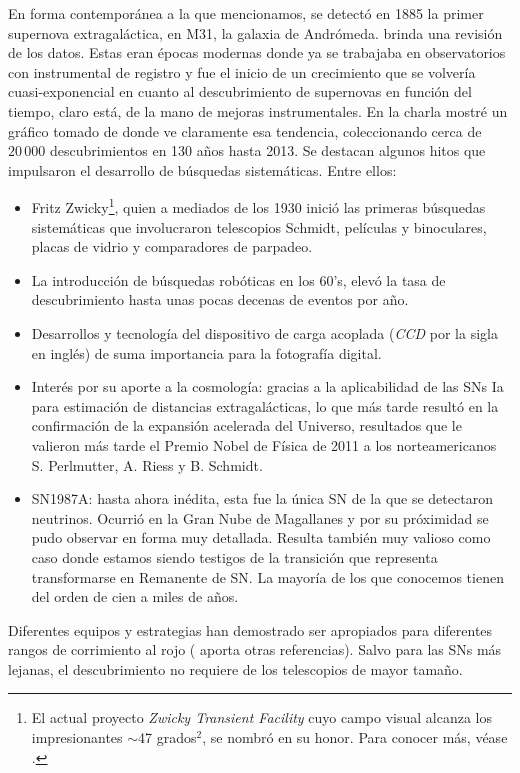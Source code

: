 \documentclass[baaa]{baaa}
\begin{document}
En forma contemporánea a la que mencionamos, se detectó en 1885 la primer supernova extragaláctica, en M31, la galaxia de Andrómeda. \cite{1985DeV} brinda una revisión de los datos.
Estas eran épocas modernas donde ya se trabajaba en observatorios con instrumental de registro y fue el inicio de un crecimiento que se volvería cuasi-exponencial en cuanto al descubrimiento de supernovas en función del tiempo, claro está, de la mano de mejoras instrumentales. En la charla mostré un gráfico tomado de \cite{2013Sullivan} donde ve claramente esa tendencia, coleccionando cerca de $20\,000$ descubrimientos en 130 años hasta 2013. 
Se destacan algunos hitos que impulsaron el desarrollo de búsquedas sistemáticas. Entre ellos:
\begin{itemize}
\item Fritz Zwicky\footnote{El actual proyecto {\em Zwicky Transient Facility} cuyo campo visual alcanza los impresionantes $\sim$47 grados$^2$, se nombró en su honor. Para conocer más, véase \cite{2019Belm}. }, quien a mediados de los 1930 inició las primeras búsquedas sistemáticas que involucraron telescopios Schmidt, películas y binoculares, placas de vidrio y comparadores de parpadeo.
\item La introducción de búsquedas robóticas en los 60's, elevó la tasa de descubrimiento hasta unas pocas decenas de eventos por año.
\item Desarrollos y tecnología del dispositivo de carga acoplada ({\em CCD} por la sigla en inglés) de suma importancia para la fotografía digital.
\item Interés por su aporte a la cosmología: gracias a la aplicabilidad de las SNs Ia para estimación de distancias extragalácticas, lo que más tarde resultó en la confirmación de la expansión acelerada del Universo, resultados que le valieron más tarde el Premio Nobel de Física de 2011 a los norteamericanos S. Perlmutter, A. Riess y B. Schmidt.
\item SN1987A: hasta ahora inédita, esta fue la única SN de la que se detectaron neutrinos. Ocurrió en la Gran Nube de Magallanes y por su próximidad se pudo observar en forma muy detallada. Resulta también muy valioso como caso donde estamos siendo testigos de la transición que representa transformarse en Remanente de SN. La mayoría de los que conocemos tienen del orden de cien a miles de años.
\end{itemize}
Diferentes equipos y estrategias han demostrado ser apropiados para diferentes rangos de corrimiento al rojo (\citealt{2017Branch} aporta otras referencias). Salvo para las SNs más lejanas, el descubrimiento no requiere de los telescopios de mayor tamaño. 
\end{document}
